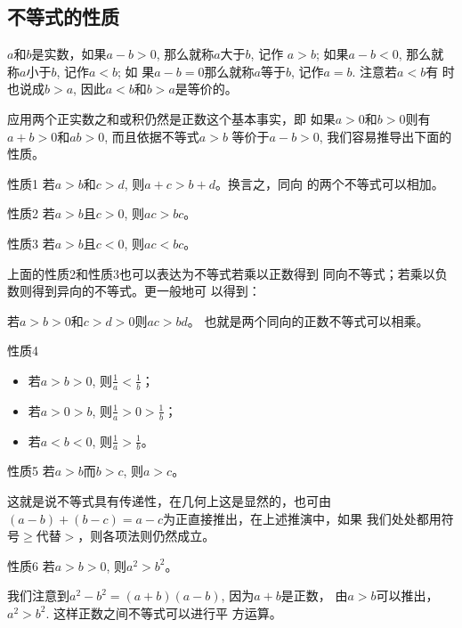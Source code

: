 \subsection{不等式的性质}
$a$和$b$是实数，如果$a-b>0$, 那么就称$a$大于$b$, 记作
$a>b$; 如果$a-b<0$, 那么就称$a$小于$b$, 记作$a<b$; 如
果$a-b=0$那么就称$a$等于$b$, 记作$a=b$. 注意若$a<b$有
时也说成$b>a$, 因此$a<b$和$b>a$是等价的。

应用两个正实数之和或积仍然是正数这个基本事实，即
如果$a>0$和$b>0$则有$a+b>0$和$ab>0$, 而且依据不等式$a>b$
等价于$a-b>0$, 我们容易推导出下面的性质。

\begin{blk}{性质1}
    若$a>b$和$c>d$, 则$a+c>b+d$。换言之，同向
的两个不等式可以相加。
\end{blk}

\begin{blk}{性质2}
    若$a>b$且$c>0$, 则$ac>bc$。
\end{blk}

\begin{blk}{性质3}
    若$a>b$且$c<0$, 则$ac<bc$。
\end{blk}

上面的性质2和性质3也可以表达为不等式若乘以正数得到
同向不等式；若乘以负数则得到异向的不等式。更一般地可
以得到：

若$a>b>0$和$c>d>0$则$ac>bd$。
也就是两个同向的正数不等式可以相乘。


\begin{blk}{性质4}
    \begin{itemize}
        \item 若$a>b>0$, 则$\frac{1}{a}<\frac{1}{b}$；
        \item 若$a>0>b$, 则$\frac{1}{a}>0>\frac{1}{b}$；
        \item 若$a<b<0$, 则$\frac{1}{a}>\frac{1}{b}$。
    \end{itemize}
 \end{blk}   

\begin{blk}{性质5}
    若$a>b$而$b>c$, 则$a>c$。
\end{blk}

这就是说不等式具有传递性，在几何上这是显然的，也可由
 $(a-b)+(b-c)=a-c$为正直接推出，在上述推演中，如果
 我们处处都用符号$\ge $代替$>$，则各项法则仍然成立。

\begin{blk}{性质6}
    若$a>b>0$, 则$a^2>b^2$。
\end{blk}

我们注意到$a^2-b^2=(a+b)(a-b)$, 因为$a+b$是正数，
 由$a>b$可以推出，$a^2>b^2$. 这样正数之间不等式可以进行平
 方运算。


